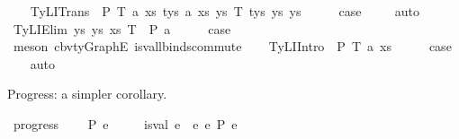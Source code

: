 \begin{isabellebody}
\ \ \isamarkupfalse%
\ {\isacharparenleft}{\kern0pt}TyLITrans\ {\isasymGamma}\ P\ T{}\ a{}\ xs{}\ tys{}\ a{}\ xs{}\ ys{}\ T{}\ tys{}\ ys{}\ ys{\isacharparenright}{\kern0pt}\isanewline
\ \ \isamarkupfalse%
\ \isamarkupfalse%
\ {\isacharquery}{\kern0pt}case\ \isanewline
\ \ \isamarkupfalse%
\ auto\isanewline
\ \ \isamarkupfalse%
\isanewline
{}\isamarkupfalse%
\isanewline
\ \ \isamarkupfalse%
\ {\isacharparenleft}{\kern0pt}TyLIElim{}\ ys\ ys{\isacharprime}{\kern0pt}\ xs\ T\ {\isasymGamma}\ P\ a{\isacharparenright}{\kern0pt}\isanewline
\ \ \isamarkupfalse%
\ \isamarkupfalse%
\ {\isacharquery}{\kern0pt}case\ \isanewline
\ \ \isamarkupfalse%
\ {\isacharparenleft}{\kern0pt}meson\ cbv{\isacharunderscore}{\kern0pt}ty{\isacharunderscore}{\kern0pt}GraphE\ is{\isacharunderscore}{\kern0pt}val{\isacharunderscore}{\kern0pt}lbinds{\isacharunderscore}{\kern0pt}commute{\isacharparenright}{\kern0pt}\isanewline
{}\isamarkupfalse%
\isanewline
\ \ \isamarkupfalse%
\ {\isacharparenleft}{\kern0pt}TyLIIntro{}\ {\isasymGamma}\ P\ T\ a\ xs{\isacharparenright}{\kern0pt}\isanewline
\ \ \isamarkupfalse%
\ \isamarkupfalse%
\ {\isacharquery}{\kern0pt}case\ \isanewline
\ \ \isamarkupfalse%
\ auto\isanewline
\ \ \isamarkupfalse%
\isanewline
{}\isamarkupfalse%
%
\endisatagproof
{\isafoldproof}%
%
\isadelimproof
%
\endisadelimproof
%
\begin{isamarkuptext}%
Progress: a simpler corollary.%
\end{isamarkuptext}\isamarkuptrue%
\isamarkupfalse%
\ progress{\isacharprime}{\kern0pt}{\isacharcolon}{\kern0pt}\isanewline
\ \ \ {\isachardoublequoteopen}{\isacharbrackleft}{\kern0pt}{\isacharbrackright}{\kern0pt}\ {\isasymturnstile}{\isacharbraceleft}{\kern0pt}P{\isacharbraceright}{\kern0pt}\ e\ {\isacharcolon}{\kern0pt}\ {\isasymtau}{\isachardoublequoteclose}\isanewline
\ \ \ {\isachardoublequoteopen}is{\isacharunderscore}{\kern0pt}val\ e\ {\isasymor}\ {\isacharparenleft}{\kern0pt}{\isasymexists}e{\isacharprime}{\kern0pt}{\isachardot}{\kern0pt}\ e\ {\isacharminus}{\kern0pt}{\isachargreater}{\kern0pt}{\isacharbraceleft}{\kern0pt}P{\isacharbraceright}{\kern0pt}\ e{\isacharprime}{\kern0pt}{\isacharparenright}{\kern0pt}{\isachardoublequoteclose}\isanewline

\end{isabellebody}
